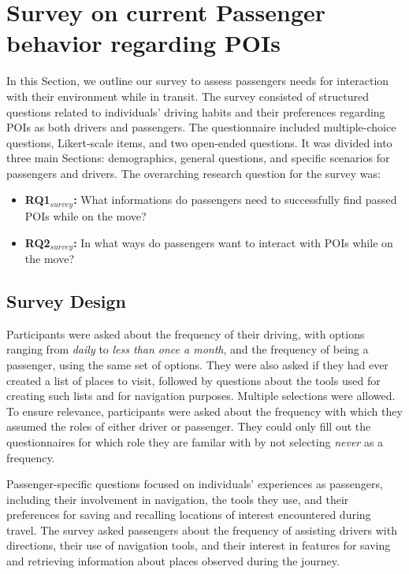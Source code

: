 \section{Survey on current Passenger behavior regarding POIs}
\label{sec:survey}
In this Section, we outline our survey to assess passengers needs for interaction with their environment while in transit. The survey consisted of structured questions related to individuals' driving habits and their preferences regarding POIs as both drivers and passengers. The questionnaire included multiple-choice questions, Likert-scale items, and two open-ended questions. It was divided into three main Sections: demographics, general questions, and specific scenarios for passengers and drivers. The overarching research question for the survey was:
\begin{itemize}
    \item \textbf{RQ1$_{survey}$:} What informations do passengers need to successfully find passed POIs while on the move?
    \item \textbf{RQ2$_{survey}$:} In what ways do passengers want to interact with POIs while on the move?
\end{itemize}



\subsection{Survey Design}
Participants were asked about the frequency of their driving, with options ranging from \textit{daily} to \textit{less than once a month}, and the frequency of being a passenger, using the same set of options. They were also asked if they had ever created a list of places to visit, followed by questions about the tools used for creating such lists and for navigation purposes. Multiple selections were allowed. To ensure relevance, participants were asked about the frequency with which they assumed the roles of either driver or passenger. They could only fill out the questionnaires for which role they are familar with by not selecting \textit{never} as a frequency.

Passenger-specific questions focused on individuals' experiences as passengers, including their involvement in navigation, the tools they use, and their preferences for saving and recalling locations of interest encountered during travel. The survey asked passengers about the frequency of assisting drivers with directions, their use of navigation tools, and their interest in features for saving and retrieving information about places observed during the journey.

